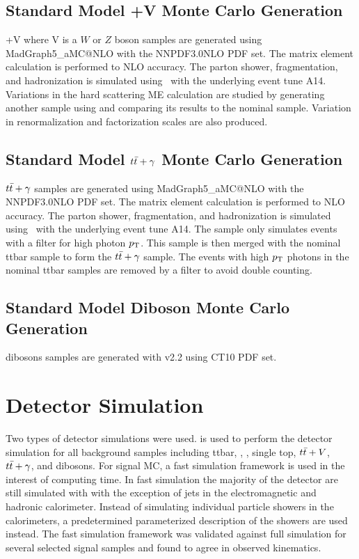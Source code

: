 \subsection{Standard Model \ttbar+V Monte Carlo Generation}

\indent \ttbar+V where V is a $W$ or $Z$ boson samples are generated using {\sc MadGraph5\_aMC\/@NLO} with the NNPDF3.0NLO PDF set. The matrix element calculation is performed to NLO accuracy. The parton shower, fragmentation, and hadronization is simulated using \pythiaeight\ with the underlying event tune A14.  Variations in the hard scattering ME calculation are studied by generating another sample using \sherpa and comparing its results to the nominal sample.  Variation in renormalization and factorization scales are also produced. \\

\subsection{Standard Model $t\bar{t}+\gamma$ Monte Carlo Generation}

\indent $t\bar{t}+\gamma$ samples are generated using {\sc MadGraph5\_aMC\/@NLO} with the NNPDF3.0NLO PDF set. The matrix element calculation is performed to NLO accuracy. The parton shower, fragmentation, and hadronization is simulated using \pythiaeight\ with the underlying event tune A14.  The sample only simulates events with a filter for high photon $p_{\mathrm{T}}$.  This sample is then merged with the nominal ttbar sample to form the $t\bar{t}+\gamma$ sample.  The events with high $p_{\mathrm{T}}$ photons in the nominal ttbar samples are removed by a filter to avoid double counting. \\

\subsection{Standard Model Diboson Monte Carlo Generation}

\indent dibosons samples are generated with \sherpa v2.2 using CT10 PDF set. \\

\section{Detector Simulation}
\label{sec:MC:DET}

\indent Two types of detector simulations were used.   is used to perform the detector simulation for all background samples including ttbar, \Wjets, \Zjets, single top, $t\bar{t}+V$, $t\bar{t}+\gamma$, and dibosons.  For signal MC, a fast simulation framework is used in the interest of computing time.  In fast simulation the majority of the detector are still simulated with  with the exception of jets in the electromagnetic and hadronic calorimeter.  Instead of simulating individual particle showers in the calorimeters, a predetermined parameterized description of the showers are used instead.  The fast simulation framework was validated against full  simulation for several selected signal samples and found to agree in observed kinematics.  \\

